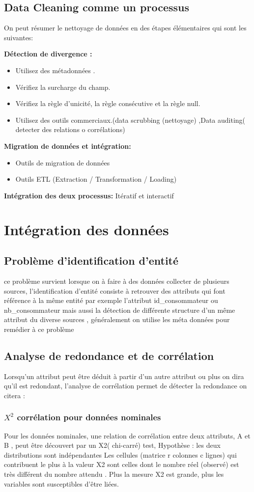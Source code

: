 \documentclass[12pt,a4paper,oneside]{book}
\begin{document}
\subsection{Data Cleaning comme un processus}
On peut résumer le nettoyage de données en des étapes élémentaires qui sont les suivantes:

\textbf{ Détection de divergence : }
\begin{itemize}
	\item Utilisez des métadonnées .
	\item Vérifiez la surcharge du champ.
	\item Vérifiez la règle d'unicité, la règle consécutive et la règle null.
	\item Utilisez des outils commerciaux.(data scrubbing (nettoyage) ,Data auditing( detecter des relations o corrélations)
	
\end{itemize}
\textbf{ Migration de données et intégration:}
\begin{itemize}
	\item Outils de migration de données
	\item Outils ETL (Extraction / Transformation / Loading)
\end{itemize}
\textbf{ Intégration des deux processus:}
Itératif et interactif 

\section{Intégration des données}
\subsection{Problème d'identification d'entité}
ce problème survient lorsque on à faire à des données collecter de plusieurs sources, l'identification d'entité consiste à retrouver des attributs  qui font référence à la même entité par exemple l'attribut id\_consommateur ou nb\_consommateur mais aussi la détection de différente structure d'un même attribut du diverse sources , généralement on utilise les méta données pour remédier à ce problème
\subsection{Analyse de redondance et de corrélation}
Lorsqu'un attribut peut être déduit à partir d'un autre attribut ou plus on dira qu'il est redondant, l'analyse de corrélation permet  de détecter la redondance  on citera :
\subsubsection{$X^2$ corrélation pour données nominales}
Pour les données nominales, une relation de corrélation entre deux attributs, A
et B , peut être découvert par un X2(  chi-carré) test,
Hypothèse : les deux distributions sont indépendantes
Les cellules (matrice r colonnes  c lignes) qui contribuent le plus à la valeur X2 sont celles dont le nombre réel (observé) est très différent du nombre attendu .
Plus la mesure X2 est grande, plus les variables sont susceptibles d'être liées.
\end{document}
